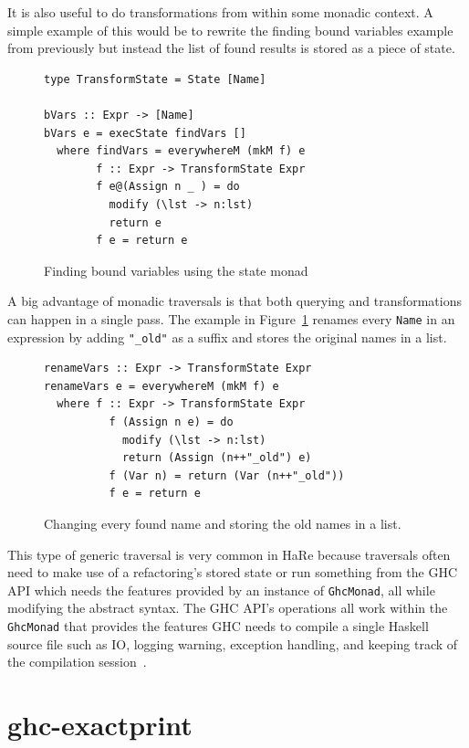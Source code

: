 It is also useful to do transformations from within some monadic context. A simple example of this would be to rewrite the finding bound variables example from previously but instead the list of found results is stored as a piece of state.

\begin{figure}[t]
\begin{lstlisting}
type TransformState = State [Name]

bVars :: Expr -> [Name]
bVars e = execState findVars []
  where findVars = everywhereM (mkM f) e
        f :: Expr -> TransformState Expr
        f e@(Assign n _ ) = do
          modify (\lst -> n:lst)
          return e
        f e = return e
\end{lstlisting}
\caption{Finding bound variables using the state monad}
\end{figure}

A big advantage of monadic traversals is that both querying and transformations can happen in a single pass. The example in Figure~\ref{renameVars} renames every \texttt{Name} in an expression by adding \texttt{"\_old"} as a suffix and stores the original names in a list. 

\begin{figure}[t]
\begin{lstlisting}
renameVars :: Expr -> TransformState Expr
renameVars e = everywhereM (mkM f) e
  where f :: Expr -> TransformState Expr
          f (Assign n e) = do
            modify (\lst -> n:lst)
            return (Assign (n++"_old") e)
          f (Var n) = return (Var (n++"_old"))
          f e = return e
\end{lstlisting}
\caption{Changing every found name and storing the old names in a list.}
\label{renameVars}
\end{figure}
 
This type of generic traversal is very common in HaRe because traversals often need to make use of a refactoring's stored state or run something from the GHC API which needs the features provided by an instance of \texttt{GhcMonad}, all while modifying the abstract syntax. The GHC API's operations all work within the \texttt{GhcMonad} that provides the features GHC needs to compile a single Haskell source file such as IO, logging warning, exception handling, and keeping track of the compilation session~\citep{ghcApi}.   
	 
\section{ghc-exactprint}
\label{ghcExactprint}

